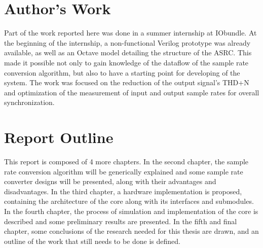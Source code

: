 \section{Author's Work}
\label{section:work}

Part of the work reported here was done in a summer internship at IObundle. At
the beginning of the internship, a non-functional Verilog prototype was already
available, as well as an Octave model detailing the structure of the ASRC. This
made it possible not only to gain knowledge of the dataflow of the sample rate
conversion algorithm, but also to have a starting point for developing of the
system. The work was focused on the reduction of the output signal's THD+N and
optimization of the measurement of input and output sample rates for overall
synchronization.

\section{Report Outline}
\label{section:outline}

This report is composed of 4 more chapters. In the second chapter, the sample
rate conversion algorithm will be generically explained and some sample rate
converter designs will be presented, along with their advantages and
disadvantages. In the third chapter, a hardware implementation is proposed,
containing the architecture of the core along with its interfaces and
submodules. In the fourth chapter, the process of simulation and implementation
of the core is described and some preliminary results are presented. In the
fifth and final chapter, some conclusions of the research needed for this thesis
are drawn, and an outline of the work that still needs to be done is defined.
